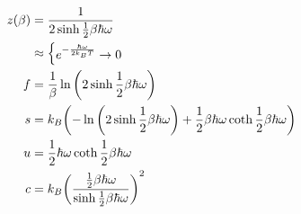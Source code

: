 \documentclass[uplatex,dvipdfmx,a4paper,11pt]{jlreq}
\theoremstyle{definition}
\begin{document}
\begin{theorem}
  \begin{align}
    z(\beta) & = \frac{1}{2\sinh \frac{1}{2}\beta\hbar\omega}                                                                       \\
             & \approx \begin{dcases}
                         e^{-\frac{\hbar\omega}{2k_BT}} \to 0 \\
                       \end{dcases}                                                                         \\
    f        & = \frac{1}{\beta}\ln\qty(2\sinh \frac{1}{2}\beta\hbar\omega)                                                         \\
    s        & = k_B\qty(-\ln\qty(2\sinh\frac{1}{2}\beta\hbar\omega) + \frac{1}{2}\beta\hbar\omega\coth\frac{1}{2}\beta\hbar\omega) \\
    u        & = \frac{1}{2}\hbar\omega\coth\frac{1}{2}\beta\hbar\omega                                                             \\
    c        & = k_B\qty(\frac{\frac{1}{2}\beta\hbar\omega}{\sinh\frac{1}{2}\beta\hbar\omega})^2
  \end{align}
\end{theorem}
\end{document}
